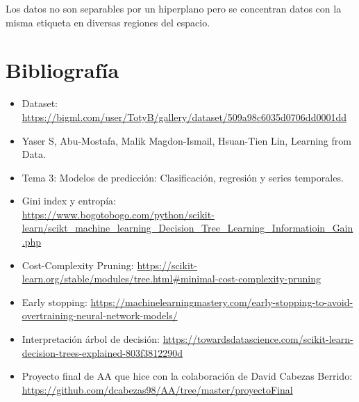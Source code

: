 \documentclass[a4]{article}
\begin{document}
Los datos no son separables por un hiperplano pero se concentran datos con la misma etiqueta en diversas regiones del espacio.

\section{Bibliografía}

\begin{itemize}
\item Dataset: \href{https://bigml.com/user/TotyB/gallery/dataset/509a98c6035d0706dd0001dd}{https://bigml.com/user/TotyB/gallery/dataset/509a98c6035d0706dd0001dd}
\item \label{Learning from Data} Yaser S, Abu-Mostafa, Malik Magdon-Ismail, Hsuan-Tien Lin, Learning from Data.
\item Tema 3: Modelos de predicción: Clasificación, regresión y series temporales.
\item Gini index y entropía: \\\href{https://www.bogotobogo.com/python/scikit-learn/scikt_machine\_learning\_Decision\_Tree\_Learning\_Informatioin\_Gain\_IG\_Impurity\_Entropy\_Gini\_Classification\_Error.php}{https://www.bogotobogo.com/python/scikit-learn/scikt\_machine\_learning\_Decision\_Tree\_Learning\_Informatioin\_Gain.php}
\item Cost-Complexity Pruning: \href{https://scikit-learn.org/stable/modules/tree.html\#minimal-cost-complexity-pruning}{https://scikit-learn.org/stable/modules/tree.html\#minimal-cost-complexity-pruning}
\item Early stopping: \href{https://machinelearningmastery.com/early-stopping-to-avoid-overtraining-neural-network-models/}{https://machinelearningmastery.com/early-stopping-to-avoid-overtraining-neural-network-models/}
\item Interpretación árbol de decisión: \href{https://towardsdatascience.com/scikit-learn-decision-trees-explained-803f3812290d}{https://towardsdatascience.com/scikit-learn-decision-trees-explained-803f3812290d}
\item Proyecto final de AA que hice con la colaboración de David Cabezas Berrido:\\ \href{https://github.com/dcabezas98/AA/tree/master/proyectoFinal}{https://github.com/dcabezas98/AA/tree/master/proyectoFinal}
\end{itemize}
\end{document}
